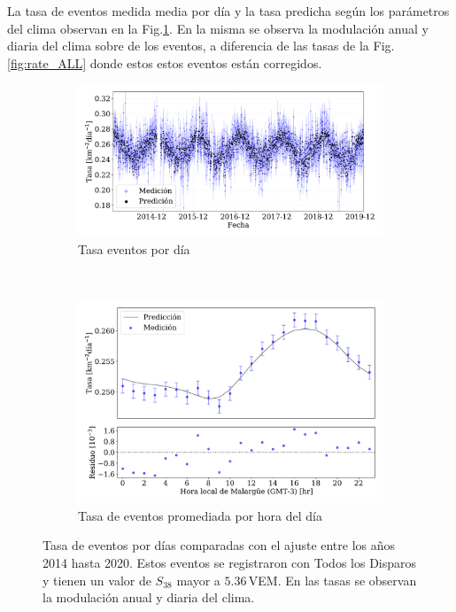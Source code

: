 La tasa de eventos medida media por día y la tasa predicha según los parámetros del clima observan en la Fig.\ref{fig:rate_dayly_AllTriggers}. En la misma se observa la modulación anual y diaria del clima sobre de los eventos, a diferencia de las tasas de la Fig.\,\ref{fig:rate_ALL} donde estos estos eventos están corregidos.  
\begin{figure}
\centering
  \begin{subfigure}[b]{0.9\textwidth}
  \includegraphics[width=\textwidth]{Graphs/rate_dayly/AllTriggers_S38_over_1EeV_rate_v3.pdf}
  \caption{Tasa eventos por día}\label{fig:rate_dayly_AllTriggers}
  \end{subfigure}\\
  \begin{subfigure}[b]{0.9\textwidth}
  \includegraphics[width=\textwidth]{Graphs/rate_hour_of_the_day/AllTriggers_S38_over_1EeV_hour_of_the_day.pdf}
  \caption{Tasa de eventos promediada por hora del día }\label{fig:rate_hod_AllTriggers}
  \end{subfigure}
  \caption{Tasa de eventos por días comparadas con el ajuste entre los años 2014 hasta 2020. Estos eventos se registraron con Todos los Disparos  y tienen un valor de $S_{38}$ mayor a $5.36\,$VEM. En las tasas se observan la modulación anual y diaria del clima. }\label{fig:rate__AllTriggers}
\end{figure}

